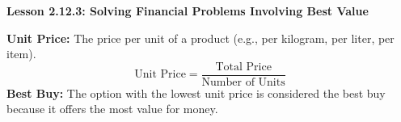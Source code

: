  \begin{center}
\textbf{Lesson 2.12.3: Solving Financial Problems Involving Best Value}
\end{center}

\vspace*{1ex}

    \noindent \textbf{Unit Price:} The price per unit of a product (e.g., per kilogram, per liter, per item).
    \[
    \text{Unit Price} = \frac{\text{Total Price}}{\text{Number of Units}}
    \]
    \noindent \textbf{Best Buy:} The option with the lowest unit price is considered the best buy because it offers the most value for money.




